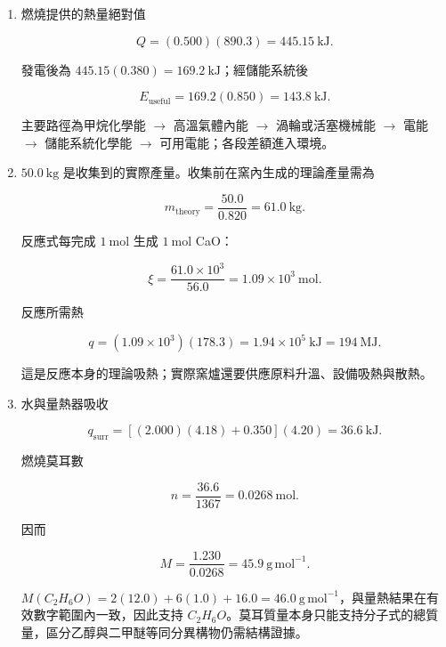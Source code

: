 \documentclass[11pt,a4paper]{article}
\begin{document}
\begin{enumerate}
  故 HCl 限量，\(\xi=0.0400\ \mathrm{mol}\)。溶液吸熱

  \[
  q_{\text{solution}}=(160)(4.18)(7.00)=4.68\ \mathrm{kJ},
  \]

  所以該次 \(q_{\text{rxn}}=-4.68\ \mathrm{kJ}\)，每莫耳反應焓

  \[
  \Delta H\approx\frac{-4.68}{0.0400}
  =-117\ \mathrm{kJ\,mol^{-1}}.
  \]

  限量試劑決定分母中的實際反應進度；以初始 Zn 全部反應作分母會低估放熱絕對值。
\item
  燃燒提供的熱量絕對值

  \[
  Q=(0.500)(890.3)=445.15\ \mathrm{kJ}.
  \]

  發電後為 \(445.15(0.380)=169.2\ \mathrm{kJ}\)；經儲能系統後

  \[
  E_{\text{useful}}=169.2(0.850)=143.8\ \mathrm{kJ}.
  \]

  主要路徑為甲烷化學能 \(\rightarrow\) 高溫氣體內能 \(\rightarrow\) 渦輪或活塞機械能 \(\rightarrow\) 電能 \(\rightarrow\) 儲能系統化學能 \(\rightarrow\) 可用電能；各段差額進入環境。
\item
  \(50.0\ \mathrm{kg}\) 是收集到的實際產量。收集前在窯內生成的理論產量需為

  \[
  m_{\text{theory}}=\frac{50.0}{0.820}=61.0\ \mathrm{kg}.
  \]

  反應式每完成 \(1\ \mathrm{mol}\) 生成 \(1\ \mathrm{mol}\) CaO：

  \[
  \xi=\frac{61.0\times10^3}{56.0}=1.09\times10^3\ \mathrm{mol}.
  \]

  反應所需熱

  \[
  q=(1.09\times10^3)(178.3)
  =1.94\times10^5\ \mathrm{kJ}=194\ \mathrm{MJ}.
  \]

  這是反應本身的理論吸熱；實際窯爐還要供應原料升溫、設備吸熱與散熱。
\item
  水與量熱器吸收

  \[
  q_{\text{surr}}
  =[(2.000)(4.18)+0.350](4.20)
  =36.6\ \mathrm{kJ}.
  \]

  燃燒莫耳數

  \[
  n=\frac{36.6}{1367}=0.0268\ \mathrm{mol}.
  \]

  因而

  \[
  M=\frac{1.230}{0.0268}=45.9\ \mathrm{g\,mol^{-1}}.
  \]

  \(M(C_2H_6O)=2(12.0)+6(1.0)+16.0=46.0\ \mathrm{g\,mol^{-1}}\)，與量熱結果在有效數字範圍內一致，因此支持 \(C_2H_6O\)。莫耳質量本身只能支持分子式的總質量，區分乙醇與二甲醚等同分異構物仍需結構證據。
\end{enumerate}
\end{document}
